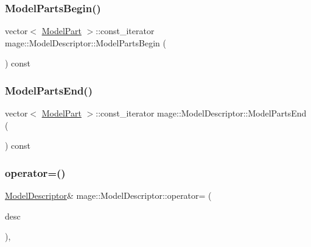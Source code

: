 \subsubsection{\texorpdfstring{Model\+Parts\+Begin()}{ModelPartsBegin()}}
{\footnotesize\ttfamily vector$<$ \hyperlink{structmage_1_1_model_part}{Model\+Part} $>$\+::const\+\_\+iterator mage\+::\+Model\+Descriptor\+::\+Model\+Parts\+Begin (\begin{DoxyParamCaption}{ }\end{DoxyParamCaption}) const}

\hypertarget{classmage_1_1_model_descriptor_a97f78d3e5a157020f62f5e6003deaac6}{}\label{classmage_1_1_model_descriptor_a97f78d3e5a157020f62f5e6003deaac6} 
\subsubsection{\texorpdfstring{Model\+Parts\+End()}{ModelPartsEnd()}}
{\footnotesize\ttfamily vector$<$ \hyperlink{structmage_1_1_model_part}{Model\+Part} $>$\+::const\+\_\+iterator mage\+::\+Model\+Descriptor\+::\+Model\+Parts\+End (\begin{DoxyParamCaption}{ }\end{DoxyParamCaption}) const}

\hypertarget{classmage_1_1_model_descriptor_a734b17224719896921e9f6252ee88483}{}\label{classmage_1_1_model_descriptor_a734b17224719896921e9f6252ee88483} 
\subsubsection{\texorpdfstring{operator=()}{operator=()}}
{\footnotesize\ttfamily \hyperlink{classmage_1_1_model_descriptor}{Model\+Descriptor}\& mage\+::\+Model\+Descriptor\+::operator= (\begin{DoxyParamCaption}\item[{const \hyperlink{classmage_1_1_model_descriptor}{Model\+Descriptor} \&}]{desc }\end{DoxyParamCaption})\hspace{0.3cm}{\ttfamily [private]}, {\ttfamily [delete]}}



